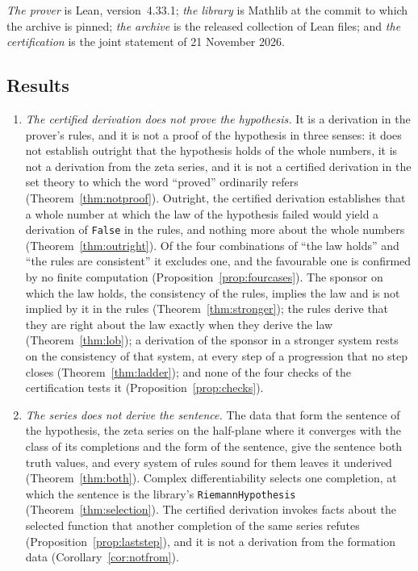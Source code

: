 \documentclass[11pt]{article}
\theoremstyle{definition}
\theoremstyle{remark}
\DeclareRobustCommand{\lean}[1]{{\renewcommand{\_}{\textunderscore\allowbreak}\texttt{#1}}}
\newcommand{\False}{\lean{False}}
\begin{document}
\emph{The prover} is Lean, version~4.33.1; \emph{the library} is Mathlib at the commit to which the archive is pinned; \emph{the archive} is the released collection of Lean files; and \emph{the certification} is the joint statement of 21 November 2026.

\subsection{Results}

\begin{enumerate}[leftmargin=2em,itemsep=2pt]
\item \emph{The certified derivation does not prove the hypothesis.} It is a derivation in the prover's rules, and it is not a proof of the hypothesis in three senses: it does not establish outright that the hypothesis holds of the whole numbers, it is not a derivation from the zeta series, and it is not a certified derivation in the set theory to which the word ``proved'' ordinarily refers (Theorem~\ref{thm:notproof}). Outright, the certified derivation establishes that a whole number at which the law of the hypothesis failed would yield a derivation of \False{} in the rules, and nothing more about the whole numbers (Theorem~\ref{thm:outright}). Of the four combinations of ``the law holds'' and ``the rules are consistent'' it excludes one, and the favourable one is confirmed by no finite computation (Proposition~\ref{prop:fourcases}). The sponsor on which the law holds, the consistency of the rules, implies the law and is not implied by it in the rules (Theorem~\ref{thm:stronger}); the rules derive that they are right about the law exactly when they derive the law (Theorem~\ref{thm:lob}); a derivation of the sponsor in a stronger system rests on the consistency of that system, at every step of a progression that no step closes (Theorem~\ref{thm:ladder}); and none of the four checks of the certification tests it (Proposition~\ref{prop:checks}).
\item \emph{The series does not derive the sentence.} The data that form the sentence of the hypothesis, the zeta series on the half-plane where it converges with the class of its completions and the form of the sentence, give the sentence both truth values, and every system of rules sound for them leaves it underived (Theorem~\ref{thm:both}). Complex differentiability selects one completion, at which the sentence is the library's \lean{RiemannHypothesis} (Theorem~\ref{thm:selection}). The certified derivation invokes facts about the selected function that another completion of the same series refutes (Proposition~\ref{prop:laststep}), and it is not a derivation from the formation data (Corollary~\ref{cor:notfrom}).

\end{enumerate}
\end{document}
